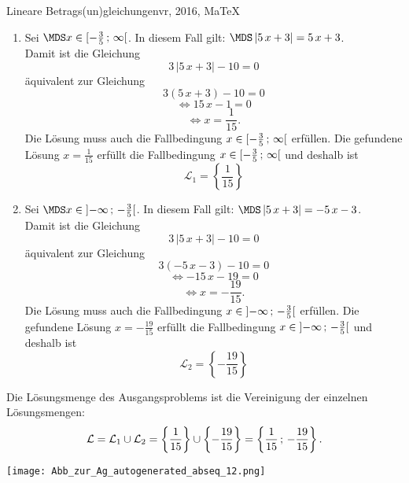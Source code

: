 \begin{MAufgabe}{Lineare Betrags(un)gleichungen}{vr, 2016, MaTeX}
 \begin{enumerate} 
 \item Sei $ \MDS x\in[ - \frac{3}{5} \, \MIntvlSep \, \infty\MoIr $. 
 In diesem Fall gilt:  
  $ \MDS \left| 5\, x + 3\right|=5\, x + 3$. \\ 
 Damit ist die Gleichung 
 $$ 
3\, \left|5\, x + 3\right| - 10= 0
$$
 \"aquivalent zur Gleichung
 $$ 
3\left(5\, x + 3\right)-10= 0 
$$  
$$ 
 \Leftrightarrow 15\, x - 1= 0 
$$  
$$ \Leftrightarrow x = \frac{1}{15} . 
 $$ 
 Die L\"osung muss auch die Fallbedingung $x\in [ - \frac{3}{5} \, ; \, \infty[\mbox{}  $ erf\"ullen. Die gefundene L\"osung $x=\frac{1}{15}$ erf\"ullt die Fallbedingung  $x\in [ - \frac{3}{5} \, ; \, \infty[\mbox{} $ und deshalb ist  $$
 \mathcal{L}_{1}=\left\{\frac{1}{15}\right\}
 $$ 
\item Sei $ \MDS x\in\MoIl  -\infty \, \MIntvlSep \, - \frac{3}{5}\MoIr $. 
 In diesem Fall gilt:  
  $ \MDS \left| 5\, x + 3\right|= - 5\, x - 3$. \\ 
 Damit ist die Gleichung 
 $$ 
3\, \left|5\, x + 3\right| - 10= 0
$$
 \"aquivalent zur Gleichung
 $$ 
3\left( - 5\, x - 3\right)-10= 0 
$$  
$$ 
 \Leftrightarrow  - 15\, x - 19= 0 
$$  
$$ \Leftrightarrow x = - \frac{19}{15} . 
 $$ 
 Die L\"osung muss auch die Fallbedingung $x\in \mbox{}]\mathopen{}  -\infty \, ; \, - \frac{3}{5}[\mbox{}  $ erf\"ullen. Die gefundene L\"osung $x=- \frac{19}{15}$ erf\"ullt die Fallbedingung  $x\in \mbox{}]\mathopen{}  -\infty \, ; \, - \frac{3}{5}[\mbox{} $ und deshalb ist  $$
 \mathcal{L}_{2}=\left\{- \frac{19}{15}\right\}
 $$ 
 \end{enumerate} 
  Die L\"osungsmenge des Ausgangsproblems ist die Vereinigung der einzelnen L\"osungsmengen: 
$$ \mathcal{L} = \mathcal{L}_{1} \cup \mathcal{L}_{2} 
 = \left\{\frac{1}{15}\right\}\cup \left\{- \frac{19}{15}\right\} 
  = \left\{\frac{1}{15}\, ; \,- \frac{19}{15}\right\} 
 . $$ 
 
 \begin{center}
 \texttt{[image: Abb\_zur\_Ag\_autogenerated\_abseq\_12.png]} \end{center}
 
\else\relax\fi
 \end{MAufgabe}